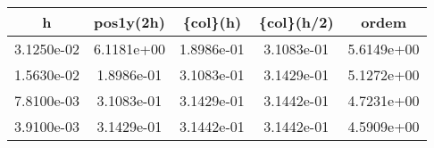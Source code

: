\begin{table}[htb]
    \centering
    \begin{tabular}{@{}ccccc@{}}
        \toprule
        h & pos1y(2h) & \{col\}(h) & \{col\}(h/2) & ordem \\ \hline
        \midrule
        3.1250e-02 & 6.1181e+00 & 1.8986e-01 & 3.1083e-01 & 5.6149e+00 \\ \hline
        1.5630e-02 & 1.8986e-01 & 3.1083e-01 & 3.1429e-01 & 5.1272e+00 \\ \hline
        7.8100e-03 & 3.1083e-01 & 3.1429e-01 & 3.1442e-01 & 4.7231e+00 \\ \hline
        3.9100e-03 & 3.1429e-01 & 3.1442e-01 & 3.1442e-01 & 4.5909e+00 \\ \hline
        \bottomrule
    \end{tabular}
\end{table}
